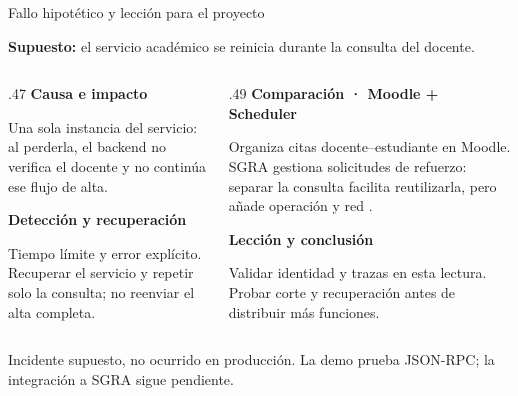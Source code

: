 \begin{frame}{Fallo hipotético y lección para el proyecto}\relax
{\small\textbf{Supuesto:} el servicio académico se reinicia durante la consulta del docente.\par}
\vspace{2mm}
\begin{columns}[T,onlytextwidth]
\begin{column}{.47\textwidth}
\textbf{Causa e impacto}\par
{\small Una sola instancia del servicio: al perderla, el backend no verifica el docente y no continúa ese flujo de alta.\par}
\medskip
\textbf{Detección y recuperación}\par
{\small Tiempo límite y error explícito. Recuperar el servicio y repetir solo la consulta; no reenviar el alta completa.\par}
\end{column}
\begin{column}{.49\textwidth}
\textbf{Comparación · Moodle + Scheduler}\par
{\small Organiza citas docente--estudiante en Moodle. SGRA gestiona solicitudes de refuerzo: separar la consulta facilita reutilizarla, pero añade operación y red \cite{moodle2025scheduler}.\par}
\medskip
\textbf{Lección y conclusión}\par
{\small Validar identidad y trazas en esta lectura. Probar corte y recuperación antes de distribuir más funciones.\par}
\end{column}
\end{columns}
\vspace{2mm}
{\scriptsize Incidente supuesto, no ocurrido en producción. La demo prueba JSON-RPC; la integración a SGRA sigue pendiente.}
\end{frame}
